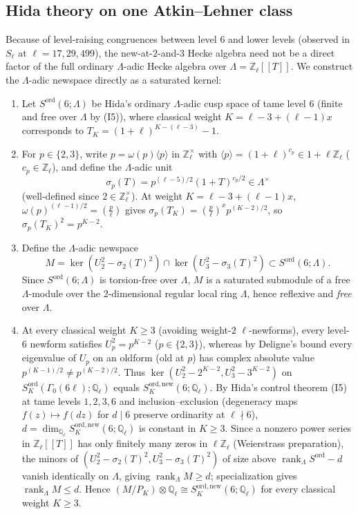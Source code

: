 \documentclass[11pt,reqno]{amsart}
\theoremstyle{definition}
\theoremstyle{remark}
\newcommand{\Z}{\mathbb{Z}}
\newcommand{\Q}{\mathbb{Q}}
\newcommand{\legendre}[2]{\left(\frac{#1}{#2}\right)}
\newcommand{\ord}{\mathrm{ord}}
\newcommand{\new}{\mathrm{new}}
\begin{document}
\subsection{Hida theory on one Atkin--Lehner class}\label{sec:hida}
Because of level-raising congruences between level $6$ and lower levels (observed in $S_\ell$ at $\ell = 17, 29, 499$), the new-at-$2$-and-$3$ Hecke algebra need not be a direct factor of the full ordinary $\Lambda$-adic Hecke algebra over $\Lambda = \Z_\ell[[T]]$. We construct the $\Lambda$-adic newspace directly as a saturated kernel:
\begin{enumerate}
  \item Let $S^\ord(6; \Lambda)$ be Hida's ordinary $\Lambda$-adic cusp space of tame level $6$ (finite and free over $\Lambda$ by (I5)), where classical weight $K = \ell - 3 + (\ell - 1)x$ corresponds to $T_K = (1+\ell)^{K - (\ell - 3)} - 1$.
  \item For $p \in \{2, 3\}$, write $p = \omega(p)\langle p \rangle$ in $\Z_\ell^\times$ with $\langle p \rangle = (1+\ell)^{c_p} \in 1 + \ell\Z_\ell$ ($c_p \in \Z_\ell$), and define the $\Lambda$-adic unit
  \[
    \sigma_p(T) = p^{(\ell-5)/2} (1 + T)^{c_p/2} \in \Lambda^\times
  \]
  (well-defined since $2 \in \Z_\ell^\times$). At weight $K = \ell - 3 + (\ell - 1)x$, $\omega(p)^{(\ell-1)/2} = \legendre{p}{\ell}$ gives $\sigma_p(T_K) = \legendre{p}{\ell}^x p^{(K-2)/2}$, so $\sigma_p(T_K)^2 = p^{K-2}$.
  \item Define the $\Lambda$-adic newspace
  \[
    M = \ker\!\left(U_2^2 - \sigma_2(T)^2\right) \cap \ker\!\left(U_3^2 - \sigma_3(T)^2\right) \subset S^\ord(6;\Lambda).
  \]
  Since $S^\ord(6;\Lambda)$ is torsion-free over $\Lambda$, $M$ is a saturated submodule of a free $\Lambda$-module over the $2$-dimensional regular local ring $\Lambda$, hence reflexive and \emph{free} over $\Lambda$.
  \item At every classical weight $K \ge 3$ (avoiding weight-$2$ $\ell$-newforms), every level-$6$ newform satisfies $U_p^2 = p^{K-2}$ ($p \in \{2,3\}$), whereas by Deligne's bound every eigenvalue of $U_p$ on an oldform (old at $p$) has complex absolute value $p^{(K-1)/2} \neq p^{(K-2)/2}$. Thus $\ker(U_2^2 - 2^{K-2}, U_3^2 - 3^{K-2})$ on $S_K^\ord(\Gamma_0(6\ell); \Q_\ell)$ equals $S_K^{\ord,\new}(6; \Q_\ell)$. By Hida's control theorem (I5) at tame levels $1, 2, 3, 6$ and inclusion--exclusion (degeneracy maps $f(z) \mapsto f(dz)$ for $d \mid 6$ preserve ordinarity at $\ell \nmid 6$), $d = \dim_{\Q_\ell} S_K^{\ord,\new}(6;\Q_\ell)$ is constant in $K \ge 3$. Since a nonzero power series in $\Z_\ell[[T]]$ has only finitely many zeros in $\ell\Z_\ell$ (Weierstrass preparation), the minors of $(U_2^2 - \sigma_2(T)^2, U_3^2 - \sigma_3(T)^2)$ of size above $\operatorname{rank}_\Lambda S^\ord - d$ vanish identically on $\Lambda$, giving $\operatorname{rank}_\Lambda M \ge d$; specialization gives $\operatorname{rank}_\Lambda M \le d$. Hence $(M / P_K) \otimes \Q_\ell \cong S_K^{\ord,\new}(6;\Q_\ell)$ for every classical weight $K \ge 3$.

\end{enumerate}
\end{document}
